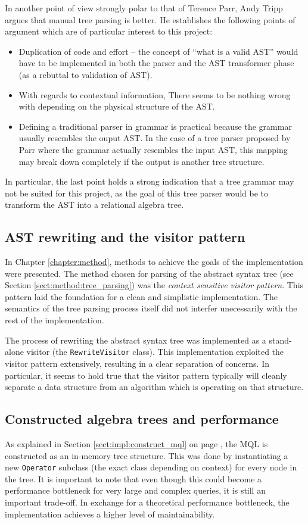 In another point of view strongly polar to that of Terence Parr, Andy Tripp
argues that manual tree parsing is better\cite{manual_tree_walking_is_better}. He establishes the following points
of argument which are of particular interest to this project:
\begin{itemize}
  \item Duplication of code and effort -- the concept of ``what is a valid AST''
  would have to be implemented in both the parser and the AST transformer phase
  (as a rebuttal to validation of AST).
  \item With regards to contextual information, There seems to be nothing wrong
  with depending on the physical structure of the AST.
  \item Defining a traditional parser in grammar is practical because the grammar
  usually resembles the ouput AST. In the case of a tree parser proposed by Parr
  where the grammar actually resembles the input AST, this mapping may break
  down completely if the output is another tree structure.
\end{itemize}

In particular, the last point holds a strong indication that a tree grammar
may not be suited for this project, as the goal of this tree parser would be to
transform the AST into a relational algebra tree.

\subsection{AST rewriting and the visitor pattern}
In Chapter \ref{chapter:method}, methods to achieve the goals
of the implementation were presented. The method chosen for parsing of the
abstract syntax tree (see Section \ref{sect:method:tree_parsing}) was the
\emph{context sensitive visitor pattern}. This pattern laid the foundation for
a clean and simplistic implementation. The semantics of the tree parsing process
itself did not interfer unecessarily with the rest of the implementation.

The process of rewriting the abstract syntax tree was implemented as a
stand-alone visitor (the \texttt{RewriteVisitor} class). This implementation
exploited the visitor pattern extensively, resulting in a clear separation of
concerns. In particular, it seems to hold true that the visitor pattern
typically will cleanly separate a data structure from an algorithm which is
operating on that structure.

\subsection{Constructed algebra trees and performance}
As explained in Section \ref{sect:impl:construct_mql} on page
\pageref{sect:impl:construct_mql}, the MQL is constructed as an in-memory tree
structure. This was done by instantiating a new \texttt{Operator} subclass
(the exact class depending on context) for every node in the tree. It is
important to note that even though this could become a performance bottleneck
for very large and complex queries, it is still an important trade-off. In
exchange for a theoretical performance bottleneck, the implementation achieves a
higher level of maintainability.